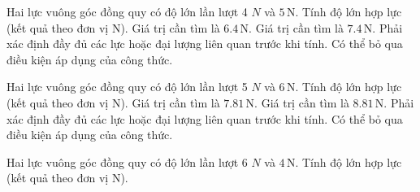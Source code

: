 \begin{ex}
Hai lực vuông góc đồng quy có độ lớn lần lượt 4 $N$ và $5\,\text{N}$. Tính độ lớn hợp lực (kết quả theo đơn vị N).
\choiceTF
{\True Giá trị cần tìm là $6.4\,\text{N}$.}
{Giá trị cần tìm là $7.4\,\text{N}$.}
{\True Phải xác định đầy đủ các lực hoặc đại lượng liên quan trước khi tính.}
{Có thể bỏ qua điều kiện áp dụng của công thức.}
\end{ex}

\begin{ex}
Hai lực vuông góc đồng quy có độ lớn lần lượt 5 $N$ và $6\,\text{N}$. Tính độ lớn hợp lực (kết quả theo đơn vị N).
\choiceTF
{\True Giá trị cần tìm là $7.81\,\text{N}$.}
{Giá trị cần tìm là $8.81\,\text{N}$.}
{\True Phải xác định đầy đủ các lực hoặc đại lượng liên quan trước khi tính.}
{Có thể bỏ qua điều kiện áp dụng của công thức.}
\end{ex}

\begin{ex}
Hai lực vuông góc đồng quy có độ lớn lần lượt 6 $N$ và $4\,\text{N}$. Tính độ lớn hợp lực (kết quả theo đơn vị N).
\end{ex}

